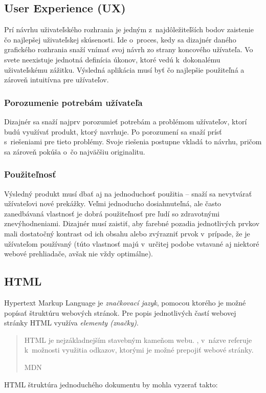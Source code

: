 \subsection{User Experience (UX)}
Prí návrhu uživateľského rozhrania je jedným z~najdôležiteľších bodov zaistenie čo najlepšej uživateľskej skúsenosti. Ide o~proces, kedy sa dizajnér daného grafického rozhrania snaží vnímať svoj návrh zo strany koncového užívateľa. Vo svete neexistuje jednotná definícia úkonov, ktoré vedú k~dokonalému uživateľskému zážitku. Výsledná aplikácia musí byť čo najlepšie použiteľná a zároveň intuitívna pre užívateľov. 

\subsubsection{Porozumenie potrebám užívateľa}
Dizajnér sa snaží najprv porozumieť potrebám a problémom užívateľov, ktorí budú využívať produkt, ktorý navrhuje. Po porozumení sa snaží prísť s~riešeniami pre tieto problémy. Svoje riešenia postupne vkladá to návrhu, pričom sa zároveň pokúša o~čo najväčšiu originalitu.

\subsubsection{Použiteľnosť}
Výsledný produkt musí dbať aj na jednoduchosť použitia -- snaží sa nevytvárať užívateľovi nové prekážky. Veľmi jednoducho dosiahnuteľná, ale často zanedbávaná vlastnosť je dobrá použiteľnosť pre ľudí so zdravotnými znevýhodneniami. Dizajnér musí zaistiť, aby farebné pozadia jednotlivých prvkov mali dostatočný kontrast od ich obsahu alebo zvýrazniť prvok v~prípade, že je užívateľom používaný (túto vlastnosť majú v~určitej podobe vstavané aj niektoré webové prehliadače, avšak nie vždy optimálne).

\subsection{HTML}
Hypertext Markup Language je \emph{značkovací jazyk}, pomocou ktorého je možné popísať štruktúru webových stránok. Pre popis jednotlivých častí webovej stránky HTML využíva \emph{elementy (značky)}.

\blockquote[MDN \cite{MDN}]{HTML je nejzákladnejším stavebným kameňom webu. , v~názve referuje k~možnosti využitia odkazov, ktorými je možné prepojiť webové stránky.}

\noindent HTML štruktúra jednoduchého dokumentu by mohla vyzerať takto: \\

